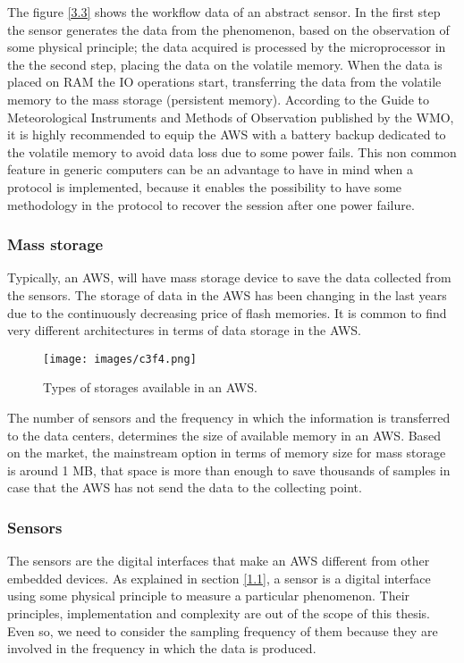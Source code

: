 {The figure \ref{3.3} shows the workflow data of an abstract sensor. In the first step the sensor generates the data from the phenomenon, based on the observation of some physical principle; the data acquired is processed by the microprocessor in the the second step, placing the data on the volatile memory. When the data is placed on \gls{RAM} the \gls{IO} operations start, transferring the data from the volatile memory to the mass storage (persistent memory). According to the Guide to Meteorological Instruments and Methods of Observation \cite{GMIMO} published by the \gls{WMO}, it is highly recommended to equip the \gls{AWS} with a battery backup dedicated to the volatile memory to avoid data loss due to some power fails. This non common feature in generic computers can be an advantage to have in mind when a protocol is implemented, because it enables the possibility to have some methodology in the protocol to recover the session after one power failure.

\subsubsection{Mass storage}

Typically, an \gls {AWS}, will have mass storage device to save the data collected from the sensors. The storage of data in the \gls{AWS} has been changing in the last years due to the continuously decreasing price of flash memories. It is common to find very different architectures in terms of data storage in the \gls{AWS}.

\begin{figure}[htb]
\centerline{\texttt{[image: images/c3f4.png]}}
\caption{Types of storages available in an \protect \gls{AWS}.}
\end{figure}

The number of sensors and the frequency in which the information is transferred to the data centers, determines the size of available memory in an \gls{AWS}. Based on the market, the mainstream option in terms of memory size for mass storage is around 1 \gls{MB}, that space is more than enough to save thousands of samples in case that the \gls{AWS} has not send the data to the collecting point.

\subsubsection{Sensors}

The sensors are the digital interfaces that make an \gls{AWS} different from other embedded devices. As explained in section \ref{1.1}, a sensor is a digital interface using some physical principle to measure a particular phenomenon. Their principles, implementation and complexity are out of the scope of this thesis. Even so, we need to consider the sampling frequency of them because they are involved in the frequency in which the data is produced.

}
